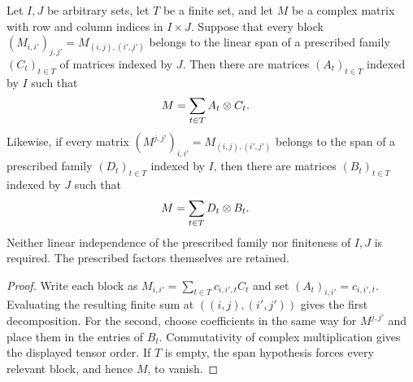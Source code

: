 \begin{theorem}
    \label{thm:operator_schmidt_prescribed_factors}
    \leanok
    Let $I,J$ be arbitrary sets, let $T$ be a finite set, and let $M$ be
    a complex matrix with row and column indices in $I\times J$.
    Suppose that every block
    $(M_{i,i'})_{j,j'}=M_{(i,j),(i',j')}$ belongs to the linear span of
    a prescribed family $(C_t)_{t\in T}$ of matrices indexed by $J$.
    Then there are matrices $(A_t)_{t\in T}$ indexed by $I$ such that
    \begin{align}
        M & =\sum_{t\in T}A_t\otimes C_t. \notag
    \end{align}
    Likewise, if every matrix
    $(M^{j,j'})_{i,i'}=M_{(i,j),(i',j')}$ belongs to the span of a
    prescribed family $(D_t)_{t\in T}$ indexed by $I$, then there are
    matrices $(B_t)_{t\in T}$ indexed by $J$ such that
    \begin{align}
        M & =\sum_{t\in T}D_t\otimes B_t. \notag
    \end{align}
    Neither linear independence of the prescribed family nor finiteness
    of $I,J$ is required. The prescribed factors themselves are retained.
\end{theorem}
\begin{proof}\leanok
    Write each block as $M_{i,i'}=\sum_{t\in T}c_{i,i',t}C_t$ and set
    $(A_t)_{i,i'}=c_{i,i',t}$. Evaluating the resulting finite sum at
    $((i,j),(i',j'))$ gives the first decomposition. For the second,
    choose coefficients in the same way for $M^{j,j'}$ and place them
    in the entries of $B_t$. Commutativity of complex multiplication
    gives the displayed tensor order. If $T$ is empty, the span
    hypothesis forces every relevant block, and hence $M$, to vanish.
\end{proof}

